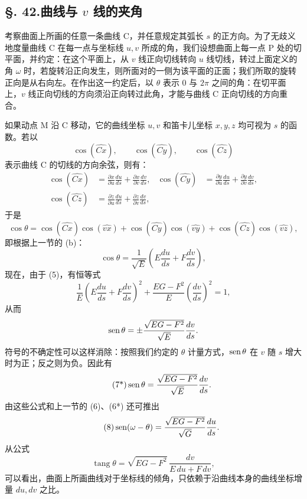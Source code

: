\subsection*{\S. 42.\quad 曲线与 \(v\) 线的夹角}

考察曲面上所画的任意一条曲线 C，并任意规定其弧长 \(s\) 的正方向。为了无歧义地度量曲线 C 在每一点与坐标线 \(u,v\) 所成的角，我们设想曲面上每一点 P 处的切平面，并约定：在这个平面上，从 \(v\) 线正向切线转向 \(u\) 线切线，转过上面定义的角 \(\omega\) 时，若旋转沿正向发生，则所面对的一侧为该平面的正面；我们所取的旋转正向是从右向左。在作出这一约定后，以 \(\theta\) 表示 0 与 \(2\pi\) 之间的角：在切平面上，\(v\) 线正向切线的方向须沿正向转过此角，才能与曲线 C 正向切线的方向重合。

如果动点 M 沿 C 移动，它的曲线坐标 \(u,v\) 和笛卡儿坐标 \(x,y,z\) 均可视为 \(s\) 的函数。若以
\[
\cos(\widehat{Cx}),\qquad \cos(\widehat{Cy}),\qquad \cos(\widehat{Cz})
\]
表示曲线 C 的切线的方向余弦，则有：
\begin{equation}\tag{c}
\begin{aligned}
\cos(\widehat{Cx})&=\frac{\partial x}{\partial u}\frac{du}{ds}+\frac{\partial x}{\partial v}\frac{dv}{ds},&
\cos(\widehat{Cy})&=\frac{\partial y}{\partial u}\frac{du}{ds}+\frac{\partial y}{\partial v}\frac{dv}{ds},\\
\cos(\widehat{Cz})&=\frac{\partial z}{\partial u}\frac{du}{ds}+\frac{\partial z}{\partial v}\frac{dv}{ds},
\end{aligned}
\end{equation}
于是
\[
\cos\theta=\cos(\widehat{Cx})\cos(\widehat{vx})+
\cos(\widehat{Cy})\cos(\widehat{vy})+
\cos(\widehat{Cz})\cos(\widehat{vz}),
\]
即根据上一节的 (b)：
\begin{equation}\tag{7}
 \cos\theta=\frac{1}{\sqrt E}\left(E\frac{du}{ds}+F\frac{dv}{ds}\right),
\end{equation}
现在，由于 (5)，有恒等式
\[
\frac{1}{E}\left(E\frac{du}{ds}+F\frac{dv}{ds}\right)^2+
\frac{EG-F^2}{E}\left(\frac{dv}{ds}\right)^2=1,
\]
从而
\[
 \operatorname{sen}\theta=\pm\frac{\sqrt{EG-F^2}}{\sqrt E}\frac{dv}{ds}.
\]
符号的不确定性可以这样消除：按照我们约定的 \(\theta\) 计量方式，\(\operatorname{sen}\theta\) 在 \(v\) 随 \(s\) 增大时为正；反之则为负。因此有
\begin{equation}\tag{7*}
 \operatorname{sen}\theta=\frac{\sqrt{EG-F^2}}{\sqrt E}\frac{dv}{ds}.
\end{equation}
由这些公式和上一节的 (6)、(6*) 还可推出
\begin{equation}\tag{8}
 \operatorname{sen}(\omega-\theta)=\frac{\sqrt{EG-F^2}}{\sqrt G}\frac{du}{ds}.
\end{equation}
从公式
\begin{equation}\tag{9}
 \operatorname{tang}\theta=\sqrt{EG-F^2}\,\frac{dv}{E\,du+F\,dv},
\end{equation}
可以看出，曲面上所画曲线对于坐标线的倾角，只依赖于沿曲线本身的曲线坐标增量 \(du,dv\) 之比。

